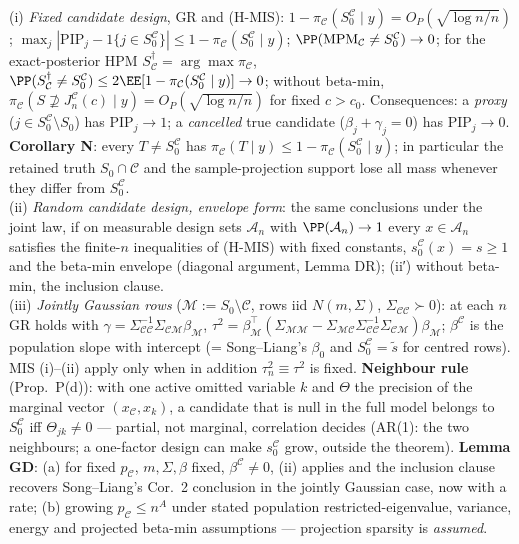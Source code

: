 \begin{theorem}[MIS]\label{reg:C-MIS_Thm-MIS_ii_}
(i) \emph{Fixed candidate design}, GR and (H-MIS): $1-\pi_{\mathcal C}(S_0^{\mathcal C}\mid y)=O_P(\sqrt{\log n/n})$; $\max_j|\mathrm{PIP}_j-1\{j\in S_0^{\mathcal C}\}|\le1-\pi_{\mathcal C}(S_0^{\mathcal C}\mid y)$; $\PP(\mathrm{MPM}_{\mathcal C}\ne S_0^{\mathcal C})\to0$; for the exact-posterior HPM $S^\dagger_{\mathcal C}=\arg\max\pi_{\mathcal C}$, $\PP(S^\dagger_{\mathcal C}\ne S_0^{\mathcal C})\le2\EE[1-\pi_{\mathcal C}(S_0^{\mathcal C}\mid y)]\to0$; without beta-min, $\pi_{\mathcal C}(S\not\supseteq J_n^{\mathcal C}(c)\mid y)=O_P(\sqrt{\log n/n})$ for fixed $c>c_0$. Consequences: a \emph{proxy} ($j\in S_0^{\mathcal C}\setminus S_0$) has $\mathrm{PIP}_j\to1$; a \emph{cancelled} true candidate ($\beta_j+\gamma_j=0$) has $\mathrm{PIP}_j\to0$. \textbf{Corollary N}: every $T\ne S_0^{\mathcal C}$ has $\pi_{\mathcal C}(T\mid y)\le1-\pi_{\mathcal C}(S_0^{\mathcal C}\mid y)$; in particular the retained truth $S_0\cap\mathcal C$ and the sample-projection support lose all mass whenever they differ from $S_0^{\mathcal C}$.\\
(ii) \emph{Random candidate design, envelope form}: the same conclusions under the joint law, if on measurable design sets $\mathcal A_n$ with $\PP(\mathcal A_n)\to1$ every $x\in\mathcal A_n$ satisfies the finite-$n$ inequalities of (H-MIS) with fixed constants, $s_0^{\mathcal C}(x)=s\ge1$ and the beta-min envelope (diagonal argument, Lemma DR); (ii′) without beta-min, the inclusion clause.\\
(iii) \emph{Jointly Gaussian rows} ($\mathcal M:=S_0\setminus\mathcal C$, rows iid $N(m,\Sigma)$, $\Sigma_{\mathcal C\mathcal C}\succ0$): at each $n$ GR holds with $\gamma=\Sigma_{\mathcal C\mathcal C}^{-1}\Sigma_{\mathcal C\mathcal M}\beta_{\mathcal M}$, $\tau^2=\beta_{\mathcal M}^\top(\Sigma_{\mathcal M\mathcal M}-\Sigma_{\mathcal M\mathcal C}\Sigma_{\mathcal C\mathcal C}^{-1}\Sigma_{\mathcal C\mathcal M})\beta_{\mathcal M}$; $\beta^{\mathcal C}$ is the population slope with intercept (= Song--Liang's $\beta_0$ and $S_0^{\mathcal C}=\tilde{s}$ for centred rows). MIS (i)--(ii) apply only when in addition $\tau_n^2\equiv\tau^2$ is fixed. \textbf{Neighbour rule} (Prop.~P(d)): with one active omitted variable $k$ and $\Theta$ the precision of the marginal vector $(x_{\mathcal C},x_k)$, a candidate that is null in the full model belongs to $S_0^{\mathcal C}$ iff $\Theta_{jk}\ne0$ — partial, not marginal, correlation decides (AR(1): the two neighbours; a one-factor design can make $s_0^{\mathcal C}$ grow, outside the theorem). \textbf{Lemma GD}: (a) for fixed $p_{\mathcal C}$, $m,\Sigma,\beta$ fixed, $\beta^{\mathcal C}\ne0$, (ii) applies and the inclusion clause recovers Song--Liang's Cor.~2 conclusion in the jointly Gaussian case, now with a rate; (b) growing $p_{\mathcal C}\le n^A$ under stated population restricted-eigenvalue, variance, energy and projected beta-min assumptions — projection sparsity is \emph{assumed}.
\end{theorem}
